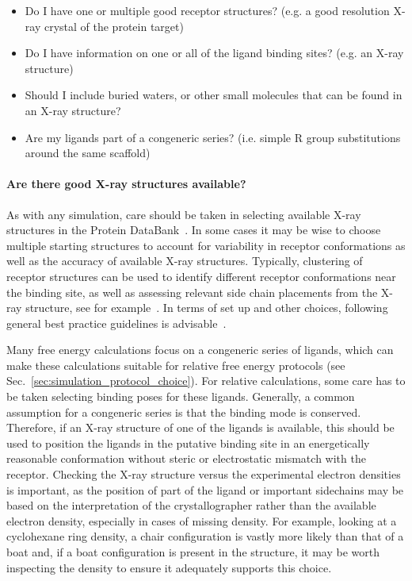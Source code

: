 \documentclass[9pt,bestpractices]{livecoms}
\begin{document}
\begin{itemize}
    \item Do I have one or multiple good receptor structures? (e.g. a good resolution X-ray crystal of the protein target)
    \item Do I have information on one or all of the ligand binding sites? (e.g. an X-ray structure)
    \item Should I include buried waters, or other small molecules that can be found in an X-ray structure?
    \item Are my ligands part of a congeneric series? (i.e. simple R group substitutions around the same scaffold)
    \end{itemize}

\paragraph{Are there good X-ray structures available?}
As with any simulation, care should be taken in selecting available X-ray structures in the Protein DataBank~\cite{berman2003announcing}. In some cases it may be wise to choose multiple starting structures to account for variability in receptor conformations as well as the accuracy of available X-ray structures. Typically, clustering of receptor structures can be used to identify different receptor conformations near the binding site, as well as assessing relevant side chain placements from the X-ray structure, see for example~\cite{mey2016blinded}. In terms of set up and other choices, following general best practice guidelines is advisable~\cite{braun2019best}.

Many free energy calculations focus on a congeneric series of ligands, which can make these calculations suitable for relative free energy protocols (see Sec.~\ref{sec:simulation_protocol_choice}). For relative calculations, some care has to be taken selecting binding poses for these ligands. Generally, a common assumption for a congeneric series is that the binding mode is conserved. Therefore, if an X-ray structure of one of the ligands is available, this should be used to position the ligands in the putative binding site in an energetically reasonable conformation without steric or electrostatic mismatch with the receptor. Checking the X-ray structure versus the experimental electron densities is important, as the position of part of the ligand or important sidechains may be based on the interpretation of the crystallographer rather than the available electron density, especially in cases of missing density. For example, looking at a cyclohexane ring density, a chair configuration is vastly more likely than that of a boat and, if a boat configuration is present in the structure, it may be worth inspecting the density to ensure it adequately supports this choice. 
\end{document}
